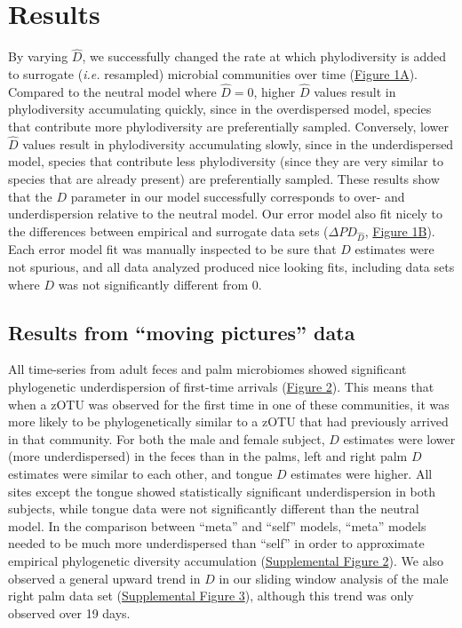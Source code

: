 \documentclass{article}
\begin{document}
\section{Results} \label{sec:results}
By varying \(\hat{D}\), we successfully changed the rate at which phylodiversity is added to surrogate (\emph{i.e.} resampled) microbial communities over time (\hyperref[sec:figure1]{Figure 1A}). Compared to the neutral model where \(\hat{D} = 0\), higher \(\hat{D}\) values result in phylodiversity accumulating quickly, since in the overdispersed model, species that contribute more phylodiversity are preferentially sampled. Conversely, lower \(\hat{D}\) values result in phylodiversity accumulating slowly, since in the underdispersed model, species that contribute less phylodiversity (since they are very similar to species that are already present) are preferentially sampled. These results show that the \(D\) parameter in our model successfully corresponds to over- and underdispersion relative to the neutral model. Our error model also fit nicely to the differences between empirical and surrogate data sets (\(\Delta PD_{\hat{D}}\), \hyperref[sec:figure1]{Figure 1B}). Each error model fit was manually inspected to be sure that \(D\) estimates were not spurious, and all data analyzed produced nice looking fits, including data sets where \(D\) was not significantly different from 0. 

\subsection{Results from “moving pictures” data}
All time-series from adult feces and palm microbiomes \cite{Caporaso2011} showed significant phylogenetic underdispersion of first-time arrivals (\hyperref[sec:figure2]{Figure 2}). This means that when a zOTU was observed for the first time in one of these communities, it was more likely to be phylogenetically similar to a zOTU that had previously arrived in that community. For both the male and female subject, \(D\) estimates were lower (more underdispersed) in the feces than in the palms, left and right palm \(D\) estimates were similar to each other, and tongue \(D\) estimates were higher. All sites except the tongue showed statistically significant underdispersion in both subjects, while tongue data were not significantly different than the neutral model. In the comparison between “meta” and “self” models, “meta” models needed to be much more underdispersed than “self” in order to approximate empirical phylogenetic diversity accumulation (\hyperref[sec:figureS2]{Supplemental Figure 2}). We also observed a general upward trend in \(D\) in our sliding window analysis of the male right palm data set (\hyperref[sec:figureS3]{Supplemental Figure 3}), although this trend was only observed over 19 days.
\end{document}

